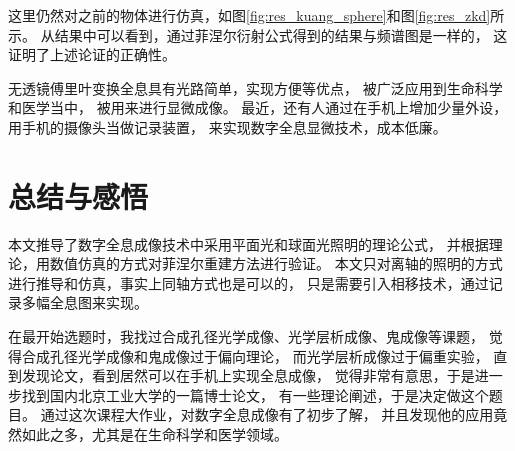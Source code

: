 \documentclass[11pt,a4paper]{article}
\begin{document}
这里仍然对之前的物体进行仿真，如图\ref{fig:res_kuang_sphere}和图\ref{fig:res_zkd}所示。
从结果中可以看到，通过菲涅尔衍射公式得到的结果与频谱图是一样的，
这证明了上述论证的正确性。


无透镜傅里叶变换全息具有光路简单，实现方便等优点，
被广泛应用到生命科学和医学当中\cite{dirksen2001lensless,pushkarsky2014automated}，
被用来进行显微成像。
最近，还有人通过在手机上增加少量外设，用手机的摄像头当做记录装置，
来实现数字全息显微技术，成本低廉\cite{vashist2014cellphone,breslauer2009mobile,tseng2010lensfree}。




\section{总结与感悟}
本文推导了数字全息成像技术中采用平面光和球面光照明的理论公式，
并根据理论，用数值仿真的方式对菲涅尔重建方法进行验证。
本文只对离轴的照明的方式进行推导和仿真，事实上同轴方式也是可以的，
只是需要引入相移技术，通过记录多幅全息图来实现\cite{王华英2008数字全息显微成像的理论和实验研究,kim2010principles}。

在最开始选题时，我找过合成孔径光学成像、光学层析成像、鬼成像等课题，
觉得合成孔径光学成像和鬼成像过于偏向理论，
而光学层析成像过于偏重实验，
直到发现论文\cite{breslauer2009mobile}，看到居然可以在手机上实现全息成像，
觉得非常有意思，于是进一步找到国内北京工业大学的一篇博士论文，
有一些理论阐述，于是决定做这个题目。
通过这次课程大作业，对数字全息成像有了初步了解，
并且发现他的应用竟然如此之多，尤其是在生命科学和医学领域。





\end{document}
